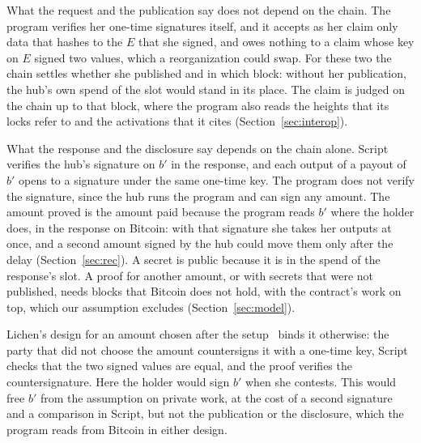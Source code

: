 \documentclass[11pt]{article}
\newcommand{\bresp}{b'}
\begin{document}
What the request and the publication say does not depend on the chain. The program verifies her one-time signatures itself, and it accepts as her claim only data that hashes to the $E$ that she signed, and owes nothing to a claim whose key on $E$ signed two values, which a reorganization could swap. For these two the chain settles whether she published and in which block: without her publication, the hub's own spend of the slot would stand in its place. The claim is judged on the chain up to that block, where the program also reads the heights that its locks refer to and the activations that it cites (Section~\ref{sec:interop}).

What the response and the disclosure say depends on the chain alone. Script verifies the hub's signature on $\bresp$ in the response, and each output of a payout of $\bresp$ opens to a signature under the same one-time key. The program does not verify the signature, since the hub runs the program and can sign any amount. The amount proved is the amount paid because the program reads $\bresp$ where the holder does, in the response on Bitcoin: with that signature she takes her outputs at once, and a second amount signed by the hub could move them only after the delay (Section~\ref{sec:rec}). A secret is public because it is in the spend of the response's slot. A proof for another amount, or with secrets that were not published, needs blocks that Bitcoin does not hold, with the contract's work on top, which our assumption excludes (Section~\ref{sec:model}).

Lichen's design for an amount chosen after the setup~\cite{delving} binds it otherwise: the party that did not choose the amount countersigns it with a one-time key, Script checks that the two signed values are equal, and the proof verifies the countersignature. Here the holder would sign $\bresp$ when she contests. This would free $\bresp$ from the assumption on private work, at the cost of a second signature and a comparison in Script, but not the publication or the disclosure, which the program reads from Bitcoin in either design.
\end{document}
